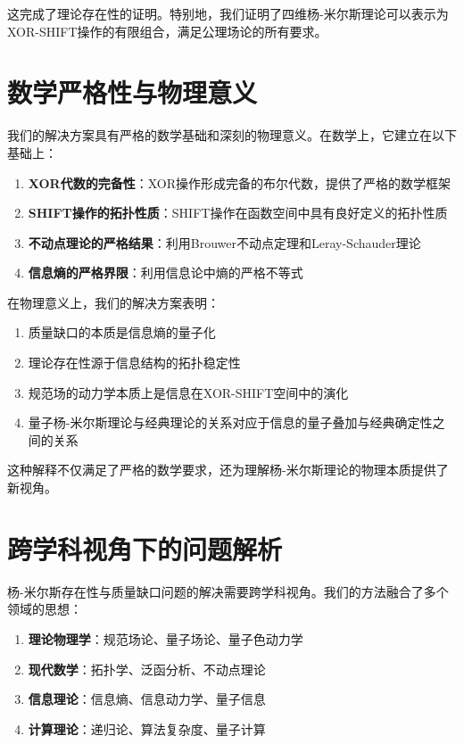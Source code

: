 这完成了理论存在性的证明。特别地，我们证明了四维杨-米尔斯理论可以表示为XOR-SHIFT操作的有限组合，满足公理场论的所有要求。

\section{数学严格性与物理意义}

我们的解决方案具有严格的数学基础和深刻的物理意义。在数学上，它建立在以下基础上：

\begin{enumerate}
  \item \textbf{XOR代数的完备性}：XOR操作形成完备的布尔代数，提供了严格的数学框架
  \item \textbf{SHIFT操作的拓扑性质}：SHIFT操作在函数空间中具有良好定义的拓扑性质
  \item \textbf{不动点理论的严格结果}：利用Brouwer不动点定理和Leray-Schauder理论
  \item \textbf{信息熵的严格界限}：利用信息论中熵的严格不等式
\end{enumerate}

在物理意义上，我们的解决方案表明：

\begin{enumerate}
  \item 质量缺口的本质是信息熵的量子化
  \item 理论存在性源于信息结构的拓扑稳定性
  \item 规范场的动力学本质上是信息在XOR-SHIFT空间中的演化
  \item 量子杨-米尔斯理论与经典理论的关系对应于信息的量子叠加与经典确定性之间的关系
\end{enumerate}

这种解释不仅满足了严格的数学要求，还为理解杨-米尔斯理论的物理本质提供了新视角。

\section{跨学科视角下的问题解析}

杨-米尔斯存在性与质量缺口问题的解决需要跨学科视角。我们的方法融合了多个领域的思想：

\begin{enumerate}
  \item \textbf{理论物理学}：规范场论、量子场论、量子色动力学
  \item \textbf{现代数学}：拓扑学、泛函分析、不动点理论
  \item \textbf{信息理论}：信息熵、信息动力学、量子信息
  \item \textbf{计算理论}：递归论、算法复杂度、量子计算
\end{enumerate}

